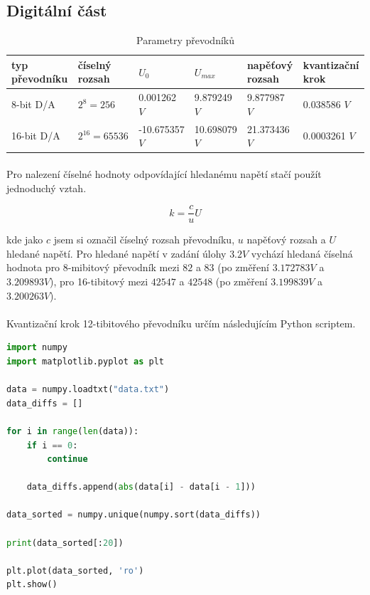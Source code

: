 \documentclass[a4paper,11pt]{article}
\begin{document}
    \subsection{Digitální část}

         \begin{table}[h]
            \centering
                \begin{tabular}{ | l | l | l | l | l | l | }
                    \hline
                    typ převodníku  & číselný rozsah  & $U_0$          & $U_{max}$     & napěťový rozsah & kvantizační krok \\ \hline
                    8-bit D/A       & $2^{8} = 256$   & 0.001262 $V$   & 9.879249 $V$  & 9.877987 $V$    & 0.038586 $V$     \\ \hline
                    16-bit D/A      & $2^{16} = 65536$ & -10.675357 $V$ & 10.698079 $V$ & 21.373436 $V$   & 0.0003261 $V$    \\
                    \hline
                \end{tabular}
            \caption{Parametry převodníků}
            \label{fig:method_b}
        \end{table}

        \paragraph{} Pro nalezení číselné hodnoty odpovídající hledanému napětí stačí použít jednoduchý vztah.

        \begin{equation}
            k = \frac{c}{u} U
        \end{equation}

        kde jako $c$ jsem si označil číselný rozsah převodníku, $u$ napěťový rozsah a $U$ hledané napětí.
        Pro hledané napětí v zadání úlohy $3.2V$ vychází hledaná číselná hodnota pro 8-mibitový převodník
        mezi $82$ a $83$ (po změření $3.172783V$ a $3.209893V$), pro 16-tibitový mezi $42547$ a $42548$
        (po změření $3.199839V$ a $3.200263V$).

        \paragraph{} Kvantizační krok 12-tibitového převodníku určím následujícím Python scriptem.

\begin{lstlisting}[language=Python]
import numpy
import matplotlib.pyplot as plt

data = numpy.loadtxt("data.txt")
data_diffs = []

for i in range(len(data)):
    if i == 0:
        continue

    data_diffs.append(abs(data[i] - data[i - 1]))

data_sorted = numpy.unique(numpy.sort(data_diffs))

print(data_sorted[:20])

plt.plot(data_sorted, 'ro')
plt.show()\end{lstlisting} 
\end{document}
